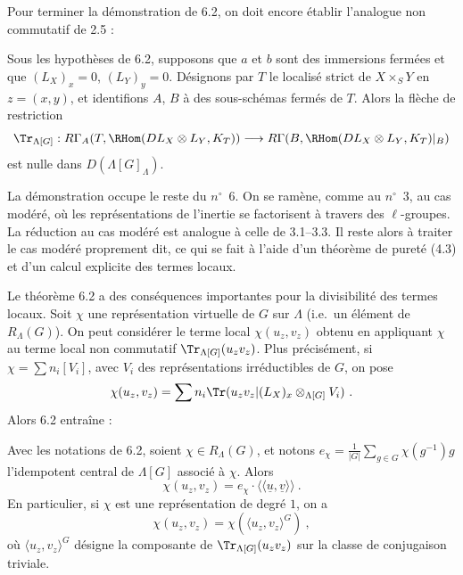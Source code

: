 Pour terminer la d\'emonstration de 6.2, on doit encore \'etablir l'analogue non commutatif de 2.5 :

\begin{proposition}[6.2.2]\label{prop:6.2.2}
Sous les hypoth\`eses de 6.2, supposons que $a$ et $b$ sont des immersions ferm\'ees et que $(L_X)_x = 0$, $(L_Y)_y = 0$. D\'esignons par $T$ le localis\'e strict de $X \times_S Y$ en $z = (x,y)$, et identifions $A$, $B$ \`a des sous-sch\'emas ferm\'es de $T$. Alors la fl\`eche de restriction
\[
\Tr_{\Lambda[G]} : R\Gamma_A(T, \RHom(DL_X \otimes L_Y, K_T)) \longrightarrow R\Gamma(B, \RHom(DL_X \otimes L_Y, K_T)|_B)
\]
est nulle dans $D(\Lambda[G]_\Lambda)$.
\end{proposition}

La d\'emonstration occupe le reste du $n^{\circ}$~6. On se ram\`ene, comme au $n^{\circ}$~3, au cas mod\'er\'e, o\`u les repr\'esentations de l'inertie se factorisent \`a travers des $\ell$-groupes. La r\'eduction au cas mod\'er\'e est analogue \`a celle de 3.1--3.3. Il reste alors \`a traiter le cas mod\'er\'e proprement dit, ce qui se fait \`a l'aide d'un th\'eor\`eme de puret\'e (4.3) et d'un calcul explicite des termes locaux.

\begin{para}
Le th\'eor\`eme 6.2 a des cons\'equences importantes pour la divisibilit\'e des termes locaux. Soit $\chi$ une repr\'esentation virtuelle de $G$ sur $\Lambda$ (i.e.\ un \'el\'ement de $R_\Lambda(G)$). On peut consid\'erer le terme local $\chi(u_z, v_z)$ obtenu en appliquant $\chi$ au terme local non commutatif $\Tr_{\Lambda[G]}(u_z v_z)$. Plus pr\'ecis\'ement, si $\chi = \sum n_i [V_i]$, avec $V_i$ des repr\'esentations irr\'eductibles de $G$, on pose
\[
\chi(u_z, v_z) = \sum n_i \Tr(u_z v_z | (L_X)_x \otimes_{\Lambda[G]} V_i) \ .
\]
Alors 6.2 entra\^ine :
\end{para}

\begin{corollaire}[6.3]\label{cor:6.3}
Avec les notations de 6.2, soient $\chi \in R_\Lambda(G)$, et notons $e_\chi = \frac{1}{|G|} \sum_{g \in G} \chi(g^{-1}) g$ l'idempotent central de $\Lambda[G]$ associ\'e \`a $\chi$. Alors
\[
\chi(u_z, v_z) = e_\chi \cdot \langle\!\langle \underline{u}, \underline{v} \rangle\!\rangle \ .
\]
En particulier, si $\chi$ est une repr\'esentation de degr\'e $1$, on a
\[
\chi(u_z, v_z) = \chi(\langle u_z, v_z \rangle^G) \ ,
\]
o\`u $\langle u_z, v_z \rangle^G$ d\'esigne la composante de $\Tr_{\Lambda[G]}(u_z v_z)$ sur la classe de conjugaison triviale.
\end{corollaire}

